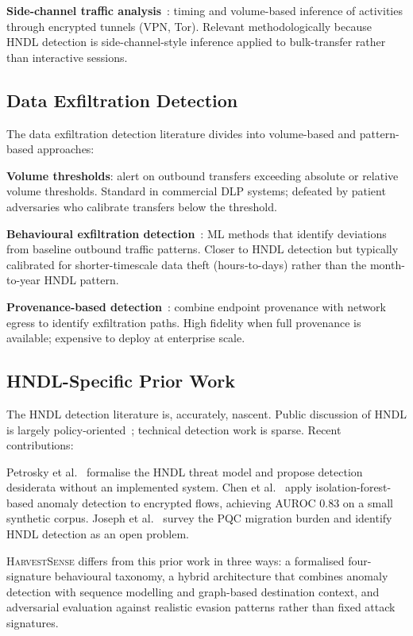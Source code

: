 \documentclass[sigconf,nonacm]{acmart}
\begin{document}
\textbf{Side-channel traffic analysis}~\cite{bahramali2024sca}: timing
and volume-based inference of activities through encrypted tunnels
(VPN, Tor). Relevant methodologically because HNDL detection is
side-channel-style inference applied to bulk-transfer rather than
interactive sessions.

\subsection{Data Exfiltration Detection}

The data exfiltration detection literature divides into volume-based
and pattern-based approaches:

\textbf{Volume thresholds}: alert on outbound transfers exceeding
absolute or relative volume thresholds. Standard in commercial DLP
systems; defeated by patient adversaries who calibrate transfers
below the threshold.

\textbf{Behavioural exfiltration detection}~\cite{deshpande2024exfilsurv}:
ML methods that identify deviations from baseline outbound traffic
patterns. Closer to HNDL detection but typically calibrated for
shorter-timescale data theft (hours-to-days) rather than the
month-to-year HNDL pattern.

\textbf{Provenance-based detection}~\cite{hassan2024provexfil}: combine
endpoint provenance with network egress to identify exfiltration paths.
High fidelity when full provenance is available; expensive to deploy
at enterprise scale.

\subsection{HNDL-Specific Prior Work}

The HNDL detection literature is, accurately, nascent. Public
discussion of HNDL is largely policy-oriented~\cite{whitehouse2022nsm10,
nsa2024cnsa2}; technical detection work is sparse. Recent
contributions:

Petrosky et al.~\cite{petrosky2024hndl} formalise the HNDL threat
model and propose detection desiderata without an implemented system.
Chen et al.~\cite{chen2025hndlflow} apply isolation-forest-based
anomaly detection to encrypted flows, achieving AUROC 0.83 on a
small synthetic corpus. Joseph et al.~\cite{joseph2024pqc} survey the
PQC migration burden and identify HNDL detection as an open problem.

\textsc{HarvestSense} differs from this prior work in three ways: a
formalised four-signature behavioural taxonomy, a hybrid architecture
that combines anomaly detection with sequence modelling and
graph-based destination context, and adversarial evaluation against
realistic evasion patterns rather than fixed attack signatures.
\end{document}
